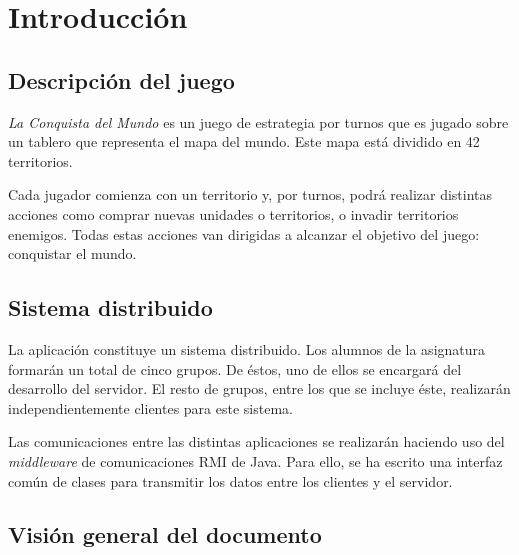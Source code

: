 \chapter{Introducción}

\section{Descripción del juego}

\textit{La Conquista del Mundo} es un juego de estrategia por turnos que es
jugado sobre un tablero que representa el mapa del mundo. Este mapa está
dividido en 42 territorios.

Cada jugador comienza con un territorio y, por turnos, podrá realizar distintas
acciones como comprar nuevas unidades o territorios, o invadir territorios
enemigos. Todas estas acciones van dirigidas a alcanzar el objetivo del juego:
conquistar el mundo.

\section{Sistema distribuido}

La aplicación constituye un sistema distribuido. Los alumnos de la asignatura
formarán un total de cinco grupos. De éstos, uno de ellos se encargará del
desarrollo del servidor. El resto de grupos, entre los que se incluye éste,
realizarán independientemente clientes para este sistema.

Las comunicaciones entre las distintas aplicaciones se realizarán haciendo uso
del \textit{middleware} de comunicaciones RMI de Java. Para ello, se ha escrito
una interfaz común de clases para transmitir los datos entre los clientes y
el servidor.

\section{Visión general del documento}

